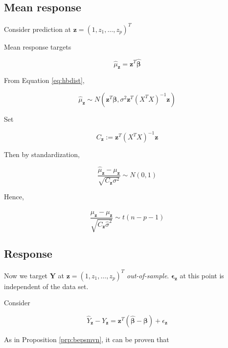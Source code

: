 \documentclass[]{book}
\theoremstyle{definition}
\theoremstyle{definition}
\theoremstyle{definition}
\theoremstyle{remark}
\begin{document}
\hypertarget{mean-response-1}{%
\subsection{Mean response}\label{mean-response-1}}

Consider prediction at \(\mathbf{z} = (1, z_1, \ldots, z_p)^T\)

Mean response targets

\[\hat\mu_{\mathbf{z}} = \mathbf{z}^T\boldsymbol{\hat\beta}\]

From Equation \eqref{eq:hbdist},

\[\hat\mu_{\mathbf{z}} \sim N(\mathbf{z}^T\boldsymbol\beta, \sigma^2\mathbf{z}^T(X^TX)^{-1}\mathbf{z})\]

Set

\begin{equation}
  C_{\mathbf{z}} := \mathbf{z}^T(X^TX)^{-1}\mathbf{z}
  \label{eq:predse}
\end{equation}

Then by standardization,

\begin{equation}
  \frac{\hat\mu_{\mathbf{z}} - \mu_{\mathbf{z}}}{\sqrt{C_{\mathbf{z}}\sigma^2}} \sim N(0, 1)
  \label{eq:meanreszdist}
\end{equation}

Hence,

\begin{equation}
  \frac{\hat\mu_{\mathbf{z}} - \mu_{\mathbf{z}}}{\sqrt{C_{\mathbf{z}}\hat\sigma^2}} \sim t(n - p - 1)
  \label{eq:meanrestdist}
\end{equation}

\hypertarget{response-1}{%
\subsection{Response}\label{response-1}}

Now we target \(\mathbf{Y}\) at \(\mathbf{z} = (1, z_1, \ldots, z_p)^T\) \emph{out-of-sample}. \(\boldsymbol\epsilon_{\mathbf{z}}\) at this point is independent of the data set.

Consider

\begin{equation}
  \hat{Y}_{\mathbf{z}} - Y_{\mathbf{z}} = \mathbf{z}^T(\boldsymbol{\hat\beta}- \boldsymbol\beta) + \epsilon_{\mathbf{z}}
  \label{eq:prerrz}
\end{equation}

As in Proposition \ref{prp:bepsmvn}, it can be proven that
\end{document}
